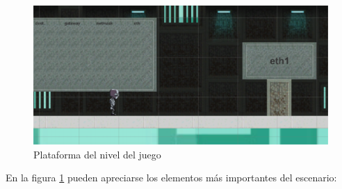 \begin{figure}[h]
  \centering
  \includegraphics[scale=0.175]{imagenes/monieco}
  \caption{Plataforma del nivel del juego}
  \label{fig:monieco}
\end{figure}

En la figura \ref{fig:monieco} pueden apreciarse los elementos más importantes del escenario:

